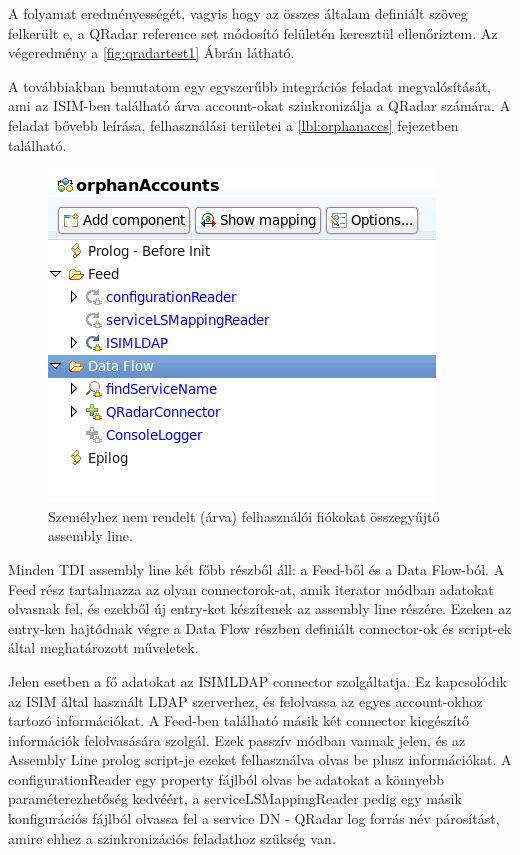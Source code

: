 A folyamat eredményességét, vagyis hogy az összes általam definiált szöveg felkerült e, a QRadar reference set módosító felületén keresztül ellenőriztem. Az végeredmény a \ref{fig:qradartest1} Ábrán látható. 
 
A továbbiakban bemutatom egy egyszerűbb integrációs feladat megvalósítását, ami az ISIM-ben található árva account-okat szinkronizálja a QRadar számára. A feladat bővebb leírása, felhasználási területei a \ref{lbl:orphanaccs} fejezetben található. 

\begin{figure}[h]
	\centering
	\includegraphics[width=0.6\linewidth]{figures/conn_test/queryAssemblyLineSmall}
	\caption{Személyhez nem rendelt (árva) felhasználói fiókokat összegyűjtő assembly line.}
	\label{fig:queryassemblyline}
\end{figure}

Minden TDI assembly line két főbb részből áll: a Feed-ből és a Data Flow-ból. A Feed rész tartalmazza az olyan connectorok-at, amik iterator módban adatokat olvasnak fel, és ezekből új entry-ket készítenek az assembly line részére. Ezeken az entry-ken hajtódnak végre a Data Flow részben definiált connector-ok és script-ek által meghatározott műveletek.

Jelen esetben a fő adatokat az ISIMLDAP connector szolgáltatja. Ez kapcsolódik az ISIM által használt LDAP szerverhez, és felolvassa az egyes account-okhoz tartozó információkat. A Feed-ben található másik két connector kiegészítő információk felolvasására szolgál. Ezek passzív módban vannak jelen, és az Assembly Line prolog script-je ezeket felhasználva olvas be plusz információkat. A configurationReader egy property fájlból olvas be adatokat a könnyebb paraméterezhetőség kedvéért, a serviceLSMappingReader pedig egy másik konfigurációs fájlból olvassa fel a service DN - QRadar log forrás név párosítást, amire ehhez a szinkronizációs feladathoz szükség van.

